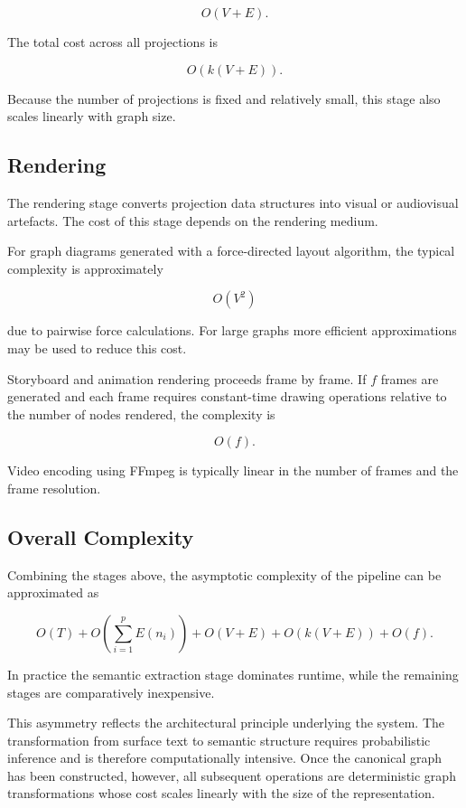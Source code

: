 \documentclass[12pt, a4paper]{article}
\begin{document}
\[
O(V + E).
\]

The total cost across all projections is

\[
O(k(V + E)).
\]

Because the number of projections is fixed and relatively small, this stage also scales linearly with graph size.

\subsection{Rendering}

The rendering stage converts projection data structures into visual or audiovisual artefacts. The cost of this stage depends on the rendering medium.

For graph diagrams generated with a force-directed layout algorithm, the typical complexity is approximately

\[
O(V^2)
\]

due to pairwise force calculations. For large graphs more efficient approximations may be used to reduce this cost.

Storyboard and animation rendering proceeds frame by frame. If $f$ frames are generated and each frame requires constant-time drawing operations relative to the number of nodes rendered, the complexity is

\[
O(f).
\]

Video encoding using FFmpeg is typically linear in the number of frames and the frame resolution.

\subsection{Overall Complexity}

Combining the stages above, the asymptotic complexity of the pipeline can be approximated as

\[
O(T) + O\!\left(\sum_{i=1}^{p} E(n_i)\right) + O(V + E) + O(k(V + E)) + O(f).
\]

In practice the semantic extraction stage dominates runtime, while the remaining stages are comparatively inexpensive.

This asymmetry reflects the architectural principle underlying the system. The transformation from surface text to semantic structure requires probabilistic inference and is therefore computationally intensive. Once the canonical graph has been constructed, however, all subsequent operations are deterministic graph transformations whose cost scales linearly with the size of the representation.
\end{document}
